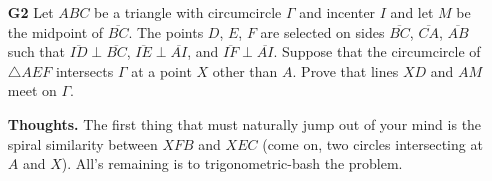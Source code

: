 \documentclass[11pt,a4paper]{article}
\begin{document}
\begin{itemize}
\newpage
\item[\textbf{G2}]
Let $ABC$ be a triangle with circumcircle $\Gamma$ and incenter $I$ and let $M$ be the midpoint of $\overline{BC}$. The points $D$, $E$, $F$ are selected on sides $\overline{BC}$, $\overline{CA}$, $\overline{AB}$ such that $\overline{ID} \perp \overline{BC}$, $\overline{IE}\perp \overline{AI}$, and $\overline{IF}\perp \overline{AI}$. Suppose that the circumcircle of $\triangle AEF$ intersects $\Gamma$ at a point $X$ other than $A$. Prove that lines $XD$ and $AM$ meet on $\Gamma$.

\textbf{Thoughts. }The first thing that must naturally jump out of your mind is the spiral similarity between $XFB$ and $XEC$ (come on, two circles intersecting at $A$ and $X$). All's remaining is to trigonometric-bash the problem. 


\end{itemize}
\end{document}
